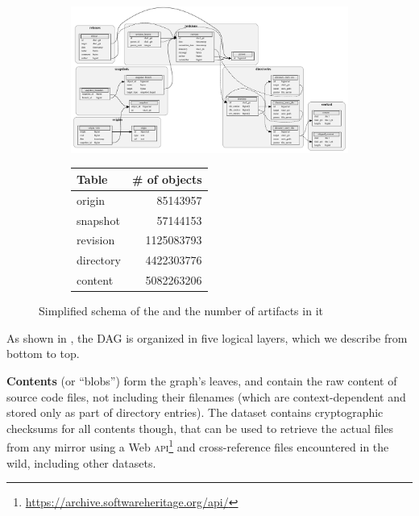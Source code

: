 \begin{figure}[t]
  \centering
    \begin{subfigure}{0.65\textwidth}
      \includegraphics[height=0.3\textheight]{../img/graph-dataset/db-schema}
    \end{subfigure}%
    \begin{subfigure}{0.17\textwidth}
      {\scriptsize
        \begin{tabular}{l r}
            \hline\textbf{Table} & \textbf{\# of objects} \\ \hline
            origin    & \num{85143957}   \\
            snapshot  & \num{57144153}   \\
            revision  & \num{1125083793} \\
            directory & \num{4422303776} \\
            content   & \num{5082263206} \\ \hline
        \end{tabular}}
        \vspace{4.1cm}
    \end{subfigure}
    \caption{Simplified schema of the \SWHGD and the number of artifacts in it}\label{fig:db-schema}%
\end{figure}

As shown in , the \SWH DAG is organized in five logical
layers, which we describe from bottom to top.

\textbf{Contents} (or ``blobs'') form the graph's leaves,
and contain the raw content
of source code files, not including their filenames (which are
context-dependent and stored only as part of directory entries).
The dataset contains cryptographic checksums for all contents though,
that can be used to retrieve the actual files from any \SWH mirror using a Web
\textsc{api}\footnote{\url{https://archive.softwareheritage.org/api/}} and
cross-reference files encountered in the wild, including other datasets.


